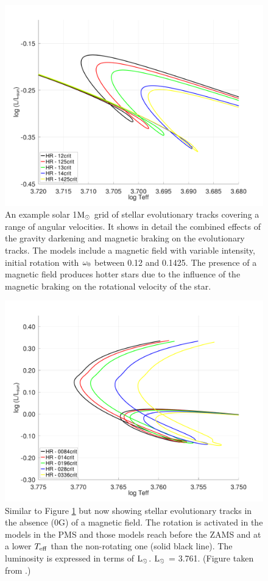 \documentclass[fleqn,usenatbib]{mnras}
\begin{document}
\begin{figure}
	\includegraphics[clip,width=\columnwidth]{figures/paper2/hr_var_vel_var_g_z13.pdf}
    \caption{An example solar 1$\mathrm{M}_\odot$ grid of stellar evolutionary tracks covering a range of angular velocities. It shows in detail the combined effects of the gravity darkening and magnetic braking on the evolutionary tracks. The models include a magnetic field with variable intensity, initial rotation with $\omega_{\mathrm{0}}$ between 0.12 and 0.1425. The presence of a magnetic field produces hotter stars due to the influence of the magnetic braking on the rotational velocity of the star.}
    \label{fig:hr_var_vel_var_g_z13}
\end{figure}

\begin{figure}
	\includegraphics[trim = 10mm 10mm 15mm 10mm, clip,width=\columnwidth]{figures/paper2/hr_var_vel_0_0g_z10.pdf}
    \caption{Similar to Figure \ref{fig:hr_var_vel_var_g_z13} but now showing stellar evolutionary tracks in the absence (0G) of a magnetic field. The rotation is activated in the models in the PMS and those models reach before the ZAMS and at a lower $T_{\mathrm{eff}}$ than the non-rotating one (solid black line). The luminosity is expressed in terms of $\mathrm{L}_\odot$. $\mathrm{L}_\odot$ = 3.761. (Figure taken from \citet{Caballero2020}.)}
    \label{fig:hr_var_vel_0g}
\end{figure}
\end{document}
